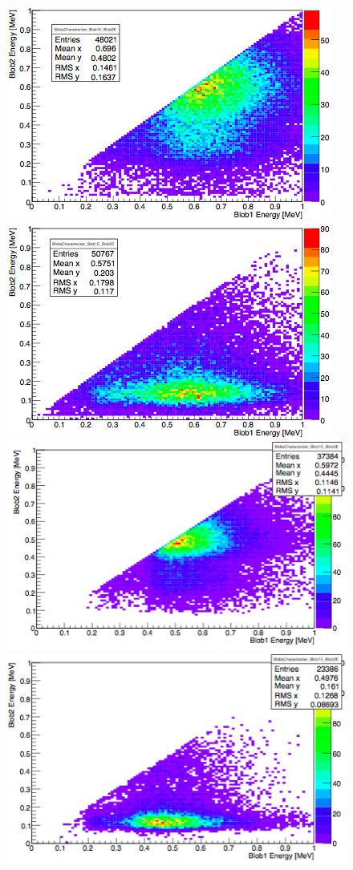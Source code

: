 \documentclass[a4paper,11pt]{article}
\begin{document}
\begin{figure}[!htb]
	\centering
	\includegraphics[scale = 0.49]{fig/blobcuts_bb0nu_10x10x5_E1vsE2.png}
	\includegraphics[scale = 0.49]{fig/blobcuts_Tl208_10x10x5_E1vsE2.png}	
	\includegraphics[scale = 0.45]{fig/blobcuts_bb0nu_2x2x2_E1vsE2.png}
	\includegraphics[scale = 0.45]{fig/blobcuts_Tl208_2x2x2_E1vsE2.png}

\end{figure}
\end{document}
